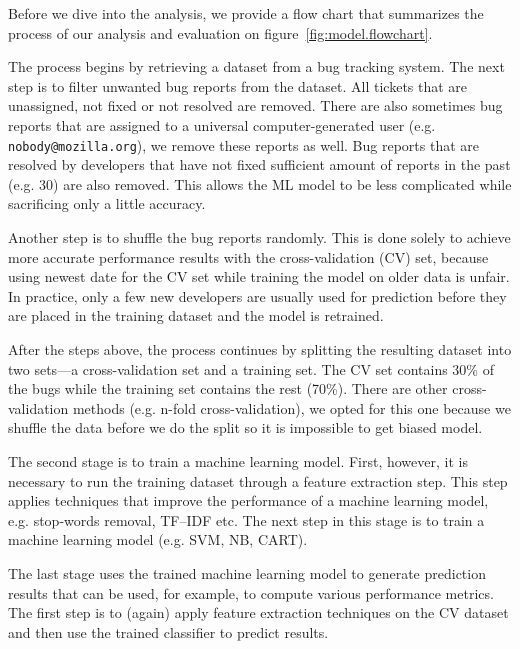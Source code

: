 Before we dive into the analysis, we provide a flow chart that summarizes the process of our analysis and evaluation on figure~\ref{fig:model.flowchart}.

The process begins by retrieving a dataset from a bug tracking system. The next step is to filter unwanted bug reports from the dataset. All tickets that are unassigned, not fixed or not resolved are removed. There are also sometimes bug reports that are assigned to a universal computer-generated user (e.g. \texttt{nobody@mozilla.org}), we remove these reports as well. Bug reports that are resolved by developers that have not fixed sufficient amount of reports in the past (e.g. 30) are also removed. This allows the ML model to be less complicated while sacrificing only a little accuracy.

Another step is to shuffle the bug reports randomly. This is done solely to achieve more accurate performance results with the cross-validation (CV) set, because using newest date for the CV set while training the model on older data is unfair. In practice, only a few new developers are usually used for prediction before they are placed in the training dataset and the model is retrained.

After the steps above, the process continues by splitting the resulting dataset into two sets---a cross-validation set and a training set. The CV set contains 30\% of the bugs while the training set contains the rest (70\%). There are other cross-validation methods (e.g. n-fold cross-validation), we opted for this one because we shuffle the data before we do the split so it is impossible to get biased model.

The second stage is to train a machine learning model. First, however, it is necessary to run the training dataset through a feature extraction step. This step applies techniques that improve the performance of a machine learning model, e.g. stop-words removal, TF--IDF etc. The next step in this stage is to train a machine learning model (e.g. SVM, NB, CART).

The last stage uses the trained machine learning model to generate prediction results that can be used, for example, to compute various performance metrics. The first step is to (again) apply feature extraction techniques on the CV dataset and then use the trained classifier to predict results.

